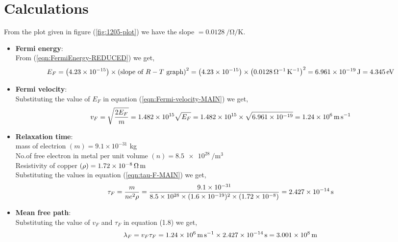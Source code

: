 	\section{Calculations}
	\noindent 
	From the plot given in figure (\ref{fig:1205-plot}) we have the slope $= \SI{0.0128}{\per\ohm\per\kelvin}$.
	\begin{itemize}
		\item \textbf{Fermi energy}:\\
		From (\ref{eqn:FermiEnergy-REDUCED}) we get,\\
		\begin{dmath*}
			E_{F}=\left(4.23\times10^{-15}\right) \times \left(\text{slope of } R-T \text{ graph}\right)^2
			=\left(4.23\times10^{-15}\right) \times \left(\SI{0.0128}{\per\ohm\per\kelvin}\right)^2
			=\SI{6.961E-19}{\joule} =\SI{4.345}{\electronvolt}
		\end{dmath*}
		
		\item \textbf{Fermi velocity}:\\
		Substituting the value of $E_{F}$ in equation (\ref{eqn:Fermi-velocity-MAIN}) we get,\\
		\begin{dmath*}
			v_F = \sqrt{\frac{2 E_{F}}{m}}
			=1.482 \times 10^{15} \sqrt{E_{F}}
			= 1.482 \times 10^{15}\times \sqrt{6.961\times 10^{-19}}
			= \SI{1.24E6}{\meter\per\second}
		\end{dmath*}
		
		\item \textbf{Relaxation time}:\\
		mass of electrion $(m)=9.1\times 10^{-31}$ kg\\
		No.of free electron in metal per unit volume $ (n)=\SI{8.5e28}{\per\meter\cubed} $\\
		Resistivity of copper $(\rho)=\SI{1.72E-8}{\ohm\meter}$\\
		Substituting the values in equation (\ref{eqn:tau-F-MAIN}) we get,\\
		\begin{dmath*}
			\tau_{F}=\dfrac{m}{ne^{2}\rho}
			=\dfrac{9.1\times 10^{-31}}{8.5\times10^{28}\times (1.6\times 10^{-19})^{2}\times (1.72\times 10^{-8}) }
			=\SI{2.427E-14}{\second}
		\end{dmath*}
		
		\item \textbf{Mean free path}:\\
		Substituting the value of $v_{F}$ and $\tau_{F}$  in equation (1.8) we get,\\
		\begin{dmath*}
			\lambda_{F}=v_{F}\tau_{F}
			=\SI{1.24E6}{\meter\per\second}\times\SI{2.427E-14}{\second}
			=\SI{3.001E8}{\meter}
		\end{dmath*}
		
	\end{itemize}
